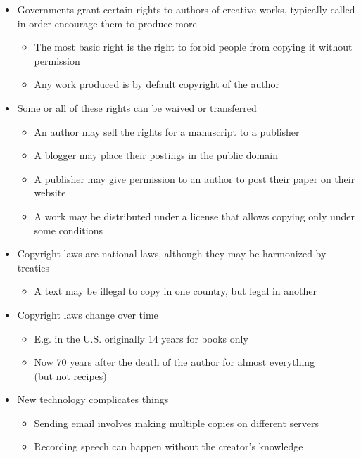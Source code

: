 \documentclass[a4paper,landscape,headrule,footrule,dvips]{foils}
\begin{document}
\begin{CJK}{UTF8}{min}
\begin{itemize}
\item Governments grant certain rights to authors of creative works,
  typically called  in order encourage them
  to produce more
  \begin{itemize}
  \item The most basic right is the right to forbid people from
    copying it without permission
  \item Any work produced is by default copyright of the author
  \end{itemize}
\item Some or all of these rights can be waived or transferred
  \begin{itemize}
  \item An author may sell the rights for a manuscript to a publisher
  \item A blogger may place their postings in the public domain
  \item A publisher may give permission to an author to post their
    paper on their website
  \item A work may be distributed under a license that allows copying only under some conditions
  \end{itemize}
\newpage
\item Copyright laws are national laws, although they may be
  harmonized by treaties
  \begin{itemize}
  \item A text may be illegal to copy in one country, but legal in another
  \end{itemize}
\item Copyright laws change over time
  \begin{itemize}
  \item E.g. in the U.S. originally 14 years for books only
  \item Now 70 years after the death of the author for almost
    everything \\ (but not recipes)
  \end{itemize}
\item New technology complicates things
  \begin{itemize}
  \item Sending email involves making multiple copies on different servers
  \item Recording speech can happen without the creator's knowledge
  \end{itemize}
\end{itemize}


\end{CJK}
\end{document}
